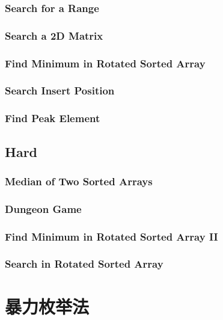 \documentclass[12pt]{book}
\begin{document}
\subsection{Search for a Range}
\label{sec-10-1-6}
\subsection{Search a 2D Matrix}
\label{sec-10-1-7}
\subsection{Find Minimum in Rotated Sorted Array}
\label{sec-10-1-8}
\subsection{Search Insert Position}
\label{sec-10-1-9}
\subsection{Find Peak Element}
\label{sec-10-1-10}
\section{Hard}
\label{sec-10-2}
\subsection{Median of Two Sorted Arrays}
\label{sec-10-2-1}
\subsection{Dungeon Game}
\label{sec-10-2-2}
\subsection{Find Minimum in Rotated Sorted Array II}
\label{sec-10-2-3}
\subsection{Search in Rotated Sorted Array}
\label{sec-10-2-4}
\chapter{暴力枚举法}
\label{sec-11}
\section{}
\label{sec-11-1}
\subsection{}
\label{sec-11-1-1}
\end{document}
